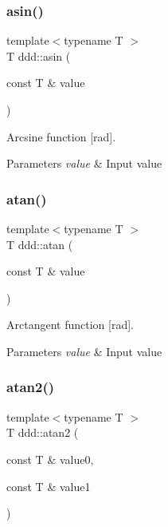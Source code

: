 \subsubsection{\texorpdfstring{asin()}{asin()}}
{\footnotesize\ttfamily template$<$typename T $>$ \\
T ddd\+::asin (\begin{DoxyParamCaption}\item[{const T \&}]{value }\end{DoxyParamCaption})\hspace{0.3cm}{\ttfamily [inline]}}



Arcsine function \mbox{[}rad\mbox{]}. 


\begin{DoxyParams}{Parameters}
{\em value} & Input value \\
\hline
\end{DoxyParams}
\mbox{\label{namespaceddd_a750f7cad6893bbbfbaa51353044bde4f}} 
\subsubsection{\texorpdfstring{atan()}{atan()}}
{\footnotesize\ttfamily template$<$typename T $>$ \\
T ddd\+::atan (\begin{DoxyParamCaption}\item[{const T \&}]{value }\end{DoxyParamCaption})\hspace{0.3cm}{\ttfamily [inline]}}



Arctangent function \mbox{[}rad\mbox{]}. 


\begin{DoxyParams}{Parameters}
{\em value} & Input value \\
\hline
\end{DoxyParams}
\mbox{\label{namespaceddd_a1dea631509d981c3718796774b796d6c}} 
\subsubsection{\texorpdfstring{atan2()}{atan2()}}
{\footnotesize\ttfamily template$<$typename T $>$ \\
T ddd\+::atan2 (\begin{DoxyParamCaption}\item[{const T \&}]{value0,  }\item[{const T \&}]{value1 }\end{DoxyParamCaption})\hspace{0.3cm}{\ttfamily [inline]}}



